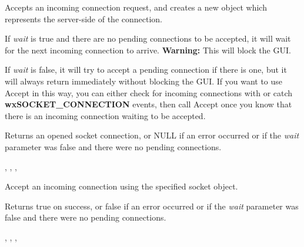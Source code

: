 %
%
\label{wxsocketserveraccept}


Accepts an incoming connection request, and creates a new 
 object which represents
the server-side of the connection.

If {\it wait} is true and there are no pending connections to be
accepted, it will wait for the next incoming connection to
arrive. {\bf Warning:} This will block the GUI.

If {\it wait} is false, it will try to accept a pending connection
if there is one, but it will always return immediately without blocking
the GUI. If you want to use Accept in this way, you can either check for
incoming connections with  
or catch {\bf wxSOCKET\_CONNECTION} events, then call Accept once you know
that there is an incoming connection waiting to be accepted.


Returns an opened socket connection, or NULL if an error occurred or
if the {\it wait} parameter was false and there were no pending
connections.


, 
, 
, 

%
%
\label{wxsocketserveracceptwith}


Accept an incoming connection using the specified socket object.




Returns true on success, or false if an error occurred or if the
{\it wait} parameter was false and there were no pending
connections.

, 
, 
, 

